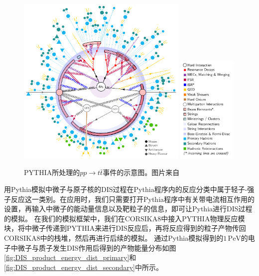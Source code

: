 \begin{figure}[htb]
\centering
    \includegraphics[width=0.73\textwidth]{img/event_generator_schem_fig.pdf}
    \includegraphics[width=0.25\textwidth]{img/event_generator_schem_legend.pdf}
    \caption{\textsf{PYTHIA}所处理的$pp\to t\bar{t}$事件的示意图。图片来自\parencite{Pythia8.3:2022}}
    \label{fig:event_generator_schem}
\end{figure}

用Pythia模拟中微子与原子核的DIS过程在Pythia程序内的反应分类中属于轻子-强子反应这一类别。在应用时，我们只需要打开Pythia程序中有关带电流相互作用的设置，再输入中微子的能动量信息以及靶粒子的信息，即可让Pythia进行DIS过程的模拟。
在我们的模拟框架中，我们在\textsf{CORSIKA8}中接入\textsf{PYTHIA}物理反应模块，将中微子传递到\textsf{PYTHIA}来进行DIS反应后，再将反应得到的粒子产物传回\textsf{CORSIKA8}中的栈堆，然后再进行后续的模拟。
通过Pythia模拟得到的$1\,\mathrm{PeV}$的电子中微子与质子发生DIS作用后得到的产物能量分布如图\ref{fig:DIS_product_energy_dist_primary}和\ref{fig:DIS_product_energy_dist_secondary}中所示。

